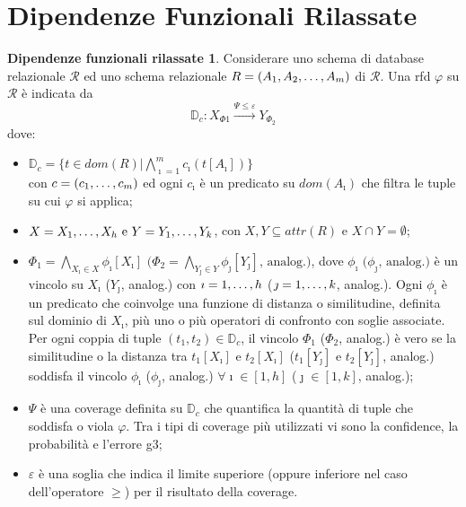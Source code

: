 \section{Dipendenze Funzionali Rilassate}
\theoremstyle{definition}
\newtheorem{rfddef}{Dipendenze funzionali rilassate}
\begin{rfddef}\label{def:rfd}
Considerare uno schema di database relazionale $\mathcal{R}$ ed uno schema relazionale $R = (A_1, A_2,\text{\textellipsis}, A_m)$ di $\mathcal{R}$. Una \acrshort{rfd} $\varphi$ su $\mathcal{R}$ \`{e} indicata da
\begin{equation}
    \mathbb{D}_c : X_{\Phi1} \xrightarrow{\Psi\leq\varepsilon} Y_{\Phi_2}
\end{equation}
dove:
\begin{itemize}
    \item $\mathbb{D}_c=\{t \in dom(R) | \bigwedge\limits_{\imath=1}^{m}c_{\imath}(t[A_{\imath}])\}$
    \\con $c=(c_1,\text{\textellipsis},c_m)$ ed ogni $c_\imath$ \`{e} un predicato su $dom(A_\imath)$ che filtra le tuple su cui $\varphi$ si applica;
    \item $X=X_1,\text{\textellipsis},X_h \text{ e } Y=Y_1,\text{\textellipsis},Y_k$, con $X,Y\subseteq attr(R)$ e $X\cap Y=\emptyset$;
    \item $\Phi_1=\bigwedge\limits_{X_\imath \in X}\phi_\imath[X_\imath] \text{ (} \Phi_2=\bigwedge\limits_{Y_\jmath \in Y}\phi_\jmath[Y_\jmath] \text{, analog.)}$, dove $\phi_\imath \text{ (}\phi_\jmath\text{, analog.)}$ \`{e} un vincolo su $X_\imath$ ($Y_\jmath$, analog.) con $\imath=1,\text{\textellipsis},h$ ($\jmath=1,\text{\textellipsis},k$, analog.). Ogni $\phi_\imath$ \`{e} un predicato che coinvolge una funzione di distanza o similitudine, definita sul dominio di $X_\imath$, pi\`{u} uno o pi\`{u} operatori di confronto con soglie associate. Per ogni coppia di tuple $(t_1,t_2)\in\mathbb{D}_c$, il vincolo $\Phi_1$ ($\Phi_2$, analog.) \`{e} vero se la similitudine o la distanza tra $t_1[X_\imath]$ e $t_2[X_\imath]$ ($t_1[Y_\jmath]$ e $t_2[Y_\jmath]$, analog.) soddisfa il vincolo $\phi_\imath$ ($\phi_\jmath$, analog.) $\forall \imath \in [1,h]$ ($\jmath \in [1,k]$, analog.);
    \item $\Psi$ \`{e} una coverage definita su $\mathbb{D}_c$ che quantifica la quantit\`{a} di tuple che soddisfa o viola $\varphi$. Tra i tipi di coverage pi\`{u} utilizzati vi sono la confidence, la probabilit\`{a} e l'errore g3;
    \item $\varepsilon$ \`{e} una soglia che indica il limite superiore (oppure inferiore nel caso dell'operatore $\geq$) per il risultato della coverage.
\end{itemize}
\end{rfddef}
